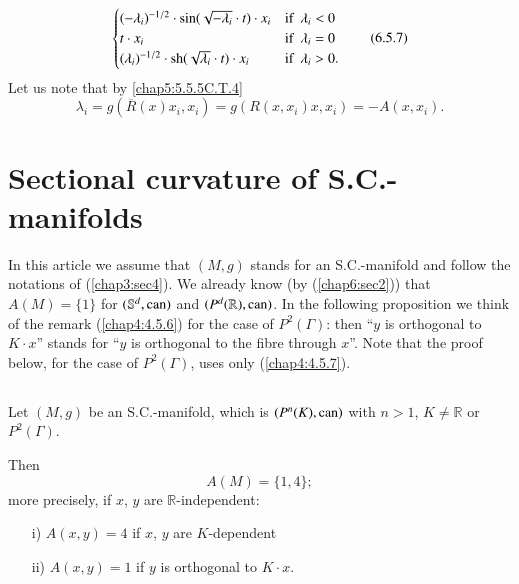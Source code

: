 \begin{remark*}
\begin{equation*}
\begin{cases}
(-\lambda_{i})^{-1/2}\cdot\sin(\sqrt{-\lambda_{i}}\cdot t)\cdot x_{i}
  &\text{if  \ } \lambda_{i}<0\\
t\cdot x_{i} & \text{if \ } \lambda_{i}=0\\
(\lambda_{i})^{-1/2}\cdot \operatorname{sh}(\sqrt{\lambda_{i}}\cdot t)\cdot x_{i} &
\text{if \ } \lambda_{i}>0.
\end{cases}\tag{6.5.7}\label{chap6:6.5.7}
\end{equation*}
Let us note that by \eqref{chap5:5.5.5C.T.4}
\begin{equation*}
\lambda_{i} = g(\overline{R}(x)x_{i},x_{i}) =
g(R(x,x_{i})x,x_{i})=-A(x,x_{i}).\tag{6.5.8}\label{chap6:6.5.8}   
\end{equation*}
\end{remark*}

\section{Sectional curvature of S.C.-manifolds}\label{chap6:sec6}

In this article we assume that $(M,g)$ stands for an S.C.-manifold and
follow the notations of (\ref{chap3:sec4}). We already know (by (\ref{chap6:sec2}))
that $A(M)=\{1\}$ for $(\mathbb{S}^{d},\operatorname{can})$ and
$(P^{d}(\mathbb{R}),\operatorname{can})$. In the following proposition we think of
the remark (\ref{chap4:4.5.6}) for the case of $P^{2}(\Gamma)$: then
``$y$ is orthogonal to $K\cdot x$'' stands for ``$y$ is orthogonal to
the fibre through $x$''. Note that the proof below, for the case of
$P^{2}(\Gamma)$, uses only (\ref{chap4:4.5.7}).


\subsection{}\label{chap6:6.6.1}

\begin{prop*}
Let $(M,g)$ be an S.C.-manifold, which is $(P^{n}(K),\operatorname{can})$ with
$n>1$, $K\neq\mathbb{R}$ or $P^{2}(\Gamma)$.

Then 
$$
A(M)=\{1,4\};
$$
more \pageoriginale precisely, if $x$, $y$ are
$\mathbb{R}$-independent:
\begin{itemize}
\item[\rm i)] $A(x,y)=4$ if $x$, $y$ are $K$-dependent

\item[\rm ii)] $A(x,y)=1$ if $y$ is orthogonal to $K\cdot x$.
\end{itemize}
\end{prop*}

